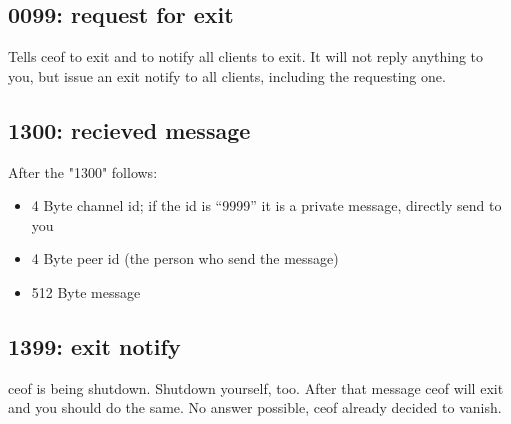\documentclass[12pt,a4paper]{article}
\begin{document}
\subsection{0099: request for exit}

Tells ceof to exit and to notify all clients to exit. It will not reply anything to you, but issue an exit notify to all clients, including the requesting one.


\subsection{1300: recieved message}
After the "1300" follows:
\begin{itemize}
\item 4 Byte channel id; if the id is "`9999"' it is a private message, directly send to you
\item 4 Byte peer id (the person who send the message)
\item 512 Byte message
\end{itemize}

\subsection{1399: exit notify}
ceof is being shutdown.
Shutdown yourself, too.
After that message ceof will exit and you should do the same.
No answer possible, ceof already decided to vanish.
\end{document}
